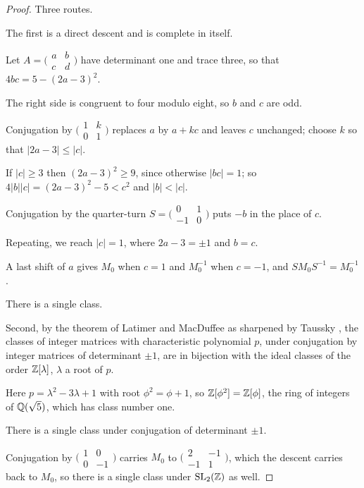 \documentclass[11pt,a4paper]{article}
\theoremstyle{plain}
\theoremstyle{definition}
\theoremstyle{remark}
\begin{document}
\begin{proof}
Three routes.

The first is a direct descent and is complete in itself.

Let $A=\bigl(\begin{smallmatrix}a&b\\c&d\end{smallmatrix}\bigr)$ have determinant one and trace three, so that $4bc=5-(2a-3)^{2}$.

The right side is congruent to four modulo eight, so $b$ and $c$ are odd.

Conjugation by $\bigl(\begin{smallmatrix}1&k\\0&1\end{smallmatrix}\bigr)$ replaces $a$ by $a+kc$ and leaves $c$ unchanged; choose $k$ so that $\lvert2a-3\rvert\leq\lvert c\rvert$.

If $\lvert c\rvert\geq3$ then $(2a-3)^{2}\geq9$, since otherwise $\lvert bc\rvert=1$; so $4\lvert b\rvert\lvert c\rvert=(2a-3)^{2}-5<c^{2}$ and $\lvert b\rvert<\lvert c\rvert$.

Conjugation by the quarter-turn $S=\bigl(\begin{smallmatrix}0&1\\-1&0\end{smallmatrix}\bigr)$ puts $-b$ in the place of $c$.

Repeating, we reach $\lvert c\rvert=1$, where $2a-3=\pm1$ and $b=c$.

A last shift of $a$ gives $M_{0}$ when $c=1$ and $M_{0}^{-1}$ when $c=-1$, and $SM_{0}S^{-1}=M_{0}^{-1}$.

There is a single class.

Second, by the theorem of Latimer and MacDuffee \cite{LatimerMacDuffee1933} as sharpened by Taussky \cite{Taussky1949}, the classes of integer matrices with characteristic polynomial $p$, under conjugation by integer matrices of determinant $\pm1$, are in bijection with the ideal classes of the order $\mathbb{Z}[\lambda]$, $\lambda$ a root of $p$.

Here $p=\lambda^{2}-3\lambda+1$ with root $\phi^{2}=\phi+1$, so $\mathbb{Z}[\phi^{2}]=\mathbb{Z}[\phi]$, the ring of integers of $\mathbb{Q}(\sqrt5)$, which has class number one.

There is a single class under conjugation of determinant $\pm1$.

Conjugation by $\bigl(\begin{smallmatrix}1&0\\0&-1\end{smallmatrix}\bigr)$ carries $M_{0}$ to $\bigl(\begin{smallmatrix}2&-1\\-1&1\end{smallmatrix}\bigr)$, which the descent carries back to $M_{0}$, so there is a single class under $\mathrm{SL}_{2}(\mathbb{Z})$ as well.


\end{proof}
\end{document}
